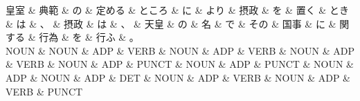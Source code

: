 \documentclass[tikz,border=5pt]{standalone}
\begin{document}
\normalsize
\begin{dependency}[edge unit distance=12.0pt]
    \begin{deptext}[column sep=1em]
        皇室 \& 典範 \& の \& 定める \& ところ \& に \& より \& 摂政 \& を \& 置く \& とき \& は \& 、 \& 摂政 \& は \& 、 \& 天皇 \& の \& 名 \& で \& その \& 国事 \& に \& 関する \& 行為 \& を \& 行ふ \& 。\\
        NOUN \& NOUN \& ADP \& VERB \& NOUN \& ADP \& VERB \& NOUN \& ADP \& VERB \& NOUN \& ADP \& PUNCT \& NOUN \& ADP \& PUNCT \& NOUN \& ADP \& NOUN \& ADP \& DET \& NOUN \& ADP \& VERB \& NOUN \& ADP \& VERB \& PUNCT\\
    \end{deptext}
\end{dependency}
\end{document}
